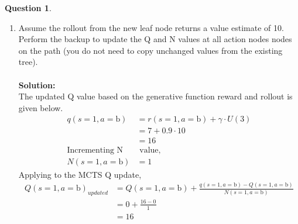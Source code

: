 \documentclass{article}
\theoremstyle{definition}
\newtheorem{question}[thm]{Question}
\begin{document}
\begin{question}
\begin{enumerate}[label=(\alph*)]
\begin{center}
\begin{minipage}{0.5\textwidth}
    \end{minipage}
    \end{center}
    \newpage
        \item Assume the rollout from the new leaf node returns a value estimate of 10. Perform the backup to update the Q and N values at all action nodes nodes on the path (you do not need to copy unchanged values from the existing tree).
        \\ \\ \noindent \textbf{Solution: }\\
        The updated Q value based on the generative function reward and rollout is given below.
    \begin{align*}
        q(s=1,a=\text{b}) &= r(s=1,a = \text{b}) + \gamma\cdot U(3)\\
        &=7 +0.9\cdot10\\
        &= 16\\
        \text{Incrementing N}&\text{ value,}\\
        N(s=1,a=\text{b}) &= 1
    \end{align*}
    Applying to the MCTS Q update,
    \begin{align*}
        Q(s=1,a=\text{b})_{updated} &= Q(s=1,a=\text{b}) + \frac{q(s=1,a=\text{b}) - Q(s=1,a=\text{b})}{N(s=1,a=\text{b})}\\
        &= 0 + \frac{16 - 0}{1} \\
        &= 16\\
    \end{align*}
    \end{enumerate}
\end{question}
\end{document}

